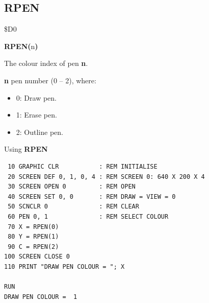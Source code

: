 \subsection{RPEN}
\begin{description}[leftmargin=2cm,style=nextline]
\item [Token:]    \$D0

\item [Format:]   {\bf RPEN(}n{\bf)}

\item [Returns:]  The colour index of pen {\bf n}.

                  {\bf n} pen number (0 -- 2), where:

                  \begin{itemize}
                     \item 0: Draw pen.
                     \item 1: Erase pen.
                     \item 2: Outline pen.
                  \end{itemize}

\item [Example:]  Using {\bf RPEN}

\begin{tcolorbox}[colback=black,coltext=white]
\verbatimfont{\codefont}
\begin{verbatim}
 10 GRAPHIC CLR           : REM INITIALISE
 20 SCREEN DEF 0, 1, 0, 4 : REM SCREEN 0: 640 X 200 X 4
 30 SCREEN OPEN 0         : REM OPEN
 40 SCREEN SET 0, 0       : REM DRAW = VIEW = 0
 50 SCNCLR 0              : REM CLEAR
 60 PEN 0, 1              : REM SELECT COLOUR
 70 X = RPEN(0)
 80 Y = RPEN(1)
 90 C = RPEN(2)
100 SCREEN CLOSE 0
110 PRINT "DRAW PEN COLOUR = "; X

RUN
DRAW PEN COLOUR =  1
\end{verbatim}
\end{tcolorbox}
\end{description}


\newpage
